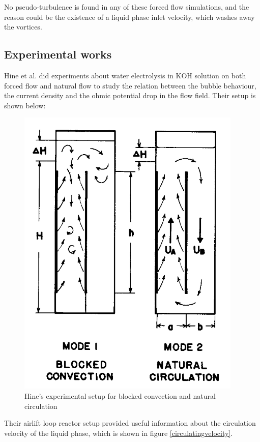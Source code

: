 No pseudo-turbulence is found in any of these forced flow simulations, and the reason could be the existence of a liquid phase inlet velocity, which washes away the vortices.

\subsection{Experimental works}

Hine et al. \cite{Hine1980} did experiments about water electrolysis in KOH solution on both forced flow and natural flow to study the relation between the bubble behaviour, the current density and the ohmic potential drop in the flow field. Their setup is shown below:

\begin{figure}[H]
    \centering
    \includegraphics[scale=0.7]{recirculatingsetup.png}
    \caption{Hine's experimental setup for blocked convection and natural circulation \cite{Hine1980}}
    \label{recirculatingsetup}
\end{figure}

Their airlift loop reactor setup provided useful information about the circulation velocity of the liquid phase, which is shown in figure \ref{circulatingvelocity}.

